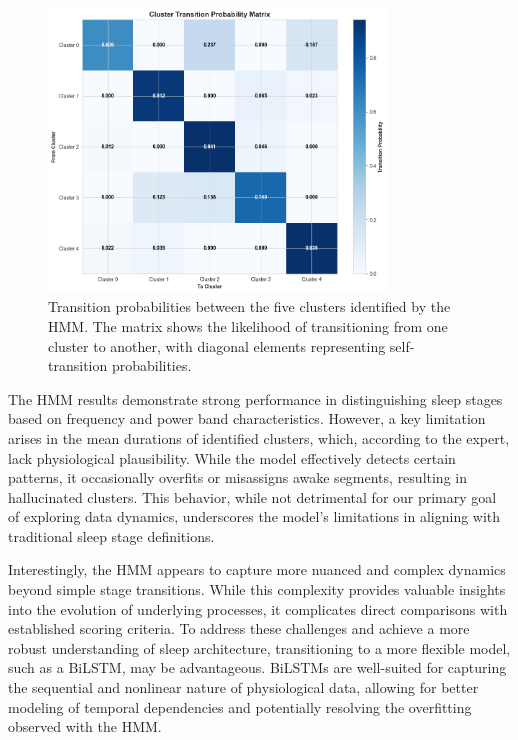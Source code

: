 \documentclass[a4paper,12pt,twoside]{article}
\begin{document}
\begin{figure}[H]
    \centering
    \includegraphics[width=0.8\textwidth]{img/HMM transitions.png}
    \caption{Transition probabilities between the five clusters identified by the HMM. The matrix shows the likelihood of transitioning from one cluster to another, with diagonal elements representing self-transition probabilities.}
    \label{fig:hmm_transition_probabilities}
\end{figure}

The HMM results demonstrate strong performance in distinguishing sleep stages based on frequency and power band characteristics. However, a key limitation arises in the mean durations of identified clusters, which, according to the expert, lack physiological plausibility. While the model effectively detects certain patterns, it occasionally overfits or misassigns awake segments, resulting in hallucinated clusters. This behavior, while not detrimental for our primary goal of exploring data dynamics, underscores the model's limitations in aligning with traditional sleep stage definitions.

Interestingly, the HMM appears to capture more nuanced and complex dynamics beyond simple stage transitions. While this complexity provides valuable insights into the evolution of underlying processes, it complicates direct comparisons with established scoring criteria. To address these challenges and achieve a more robust understanding of sleep architecture, transitioning to a more flexible model, such as a BiLSTM, may be advantageous. BiLSTMs are well-suited for capturing the sequential and nonlinear nature of physiological data, allowing for better modeling of temporal dependencies and potentially resolving the overfitting observed with the HMM.
\end{document}
